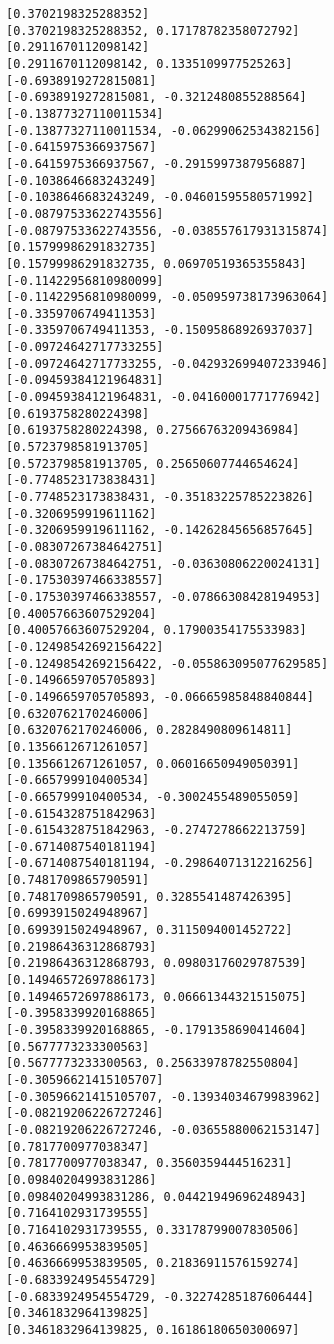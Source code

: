 \documentclass[11pt]{article}
\begin{document}
\begin{Verbatim}[commandchars=\\\{\}]
[0.3702198325288352]
[0.3702198325288352, 0.17178782358072792]
[0.2911670112098142]
[0.2911670112098142, 0.1335109977525263]
[-0.6938919272815081]
[-0.6938919272815081, -0.3212480855288564]
[-0.13877327110011534]
[-0.13877327110011534, -0.06299062534382156]
[-0.6415975366937567]
[-0.6415975366937567, -0.2915997387956887]
[-0.1038646683243249]
[-0.1038646683243249, -0.04601595580571992]
[-0.08797533622743556]
[-0.08797533622743556, -0.038557617931315874]
[0.15799986291832735]
[0.15799986291832735, 0.06970519365355843]
[-0.11422956810980099]
[-0.11422956810980099, -0.050959738173963064]
[-0.3359706749411353]
[-0.3359706749411353, -0.15095868926937037]
[-0.09724642717733255]
[-0.09724642717733255, -0.042932699407233946]
[-0.09459384121964831]
[-0.09459384121964831, -0.04160001771776942]
[0.6193758280224398]
[0.6193758280224398, 0.27566763209436984]
[0.5723798581913705]
[0.5723798581913705, 0.25650607744654624]
[-0.7748523173838431]
[-0.7748523173838431, -0.35183225785223826]
[-0.3206959919611162]
[-0.3206959919611162, -0.14262845656857645]
[-0.08307267384642751]
[-0.08307267384642751, -0.03630806220024131]
[-0.17530397466338557]
[-0.17530397466338557, -0.07866308428194953]
[0.40057663607529204]
[0.40057663607529204, 0.17900354175533983]
[-0.12498542692156422]
[-0.12498542692156422, -0.055863095077629585]
[-0.1496659705705893]
[-0.1496659705705893, -0.06665985848840844]
[0.6320762170246006]
[0.6320762170246006, 0.2828490809614811]
[0.1356612671261057]
[0.1356612671261057, 0.06016650949050391]
[-0.665799910400534]
[-0.665799910400534, -0.3002455489055059]
[-0.6154328751842963]
[-0.6154328751842963, -0.2747278662213759]
[-0.6714087540181194]
[-0.6714087540181194, -0.29864071312216256]
[0.7481709865790591]
[0.7481709865790591, 0.3285541487426395]
[0.6993915024948967]
[0.6993915024948967, 0.3115094001452722]
[0.21986436312868793]
[0.21986436312868793, 0.09803176029787539]
[0.14946572697886173]
[0.14946572697886173, 0.06661344321515075]
[-0.3958339920168865]
[-0.3958339920168865, -0.1791358690414604]
[0.5677773233300563]
[0.5677773233300563, 0.25633978782550804]
[-0.30596621415105707]
[-0.30596621415105707, -0.13934034679983962]
[-0.08219206226727246]
[-0.08219206226727246, -0.03655880062153147]
[0.7817700977038347]
[0.7817700977038347, 0.3560359444516231]
[0.09840204993831286]
[0.09840204993831286, 0.04421949696248943]
[0.7164102931739555]
[0.7164102931739555, 0.33178799007830506]
[0.4636669953839505]
[0.4636669953839505, 0.21836911576159274]
[-0.6833924954554729]
[-0.6833924954554729, -0.32274285187606444]
[0.3461832964139825]
[0.3461832964139825, 0.16186180650300697]

\end{Verbatim}
\end{document}
